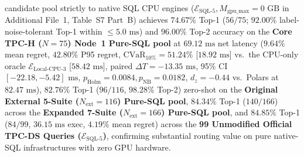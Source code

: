 \documentclass[10pt,a4paper]{article}
\begin{document}
candidate pool strictly to native SQL CPU engines ($\mathcal{E}_{\text{SQL-5}}, M_{\text{gpu\_max}}=0\text{ GB}$ in Additional File~1, Table~S7 Part~B) achieves $\mathbf{74.67\%}$ Top-1 ($56/75$; $\mathbf{92.00\%}$ label-noise-tolerant Top-1 within $\le 5.0\text{ ms}$) and $\mathbf{96.00\%}$ Top-2 accuracy on the \textbf{Core TPC-H ($N=75$) Node~1 Pure-SQL pool} at $69.12\text{ ms}$ net latency ($9.64\%$ mean regret, $42.80\%$ P95 regret, $\text{CVaR}_{10\%}=51.24\%$ [$18.92\text{ ms}$] vs.\ the CPU-only oracle $\mathcal{E}_{\text{Local-CPU-3}}$ [$58.42\text{ ms}$], paired $\Delta T = -13.35\text{ ms}$, 95\% CI $[-22.18, -5.42]\text{ ms}$, $p_{\text{Holm}}=0.0084, p_{\text{NB}}=0.0182$, $d_z = -0.44$ vs.\ Polars at $82.47\text{ ms}$), $\mathbf{82.76\%}$ Top-1 ($96/116$, $\mathbf{98.28\%}$ Top-2) zero-shot on the \textbf{Original External 5-Suite ($N_{\text{ext}}=116$) Pure-SQL pool}, $\mathbf{84.34\%}$ Top-1 ($140/166$) across the \textbf{Expanded 7-Suite ($N_{\text{ext}}=166$) Pure-SQL pool}, and $\mathbf{84.85\%}$ Top-1 ($84/99$, $36.15\text{ ms}$ exec, $4.19\%$ mean regret) across the \textbf{99 Unmodified Official TPC-DS Queries ($\mathcal{E}_{\text{SQL-5}}$)}, confirming substantial routing value on pure native-SQL infrastructures with zero GPU hardware.
\end{document}
